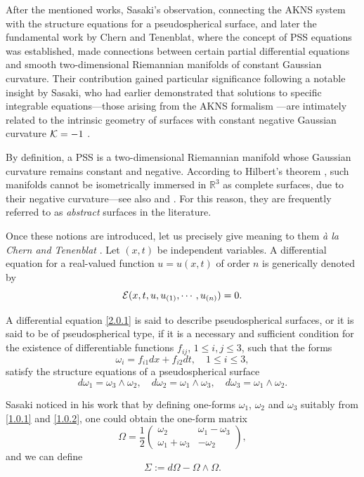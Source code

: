 \documentclass{cimart}
\newcommand{\bb}{\begin{equation}}
\newcommand{\ee}{\end{equation}}
\begin{document}
After the mentioned works, Sasaki's observation, connecting the AKNS system \cite{akns} with the structure equations for a pseudospherical surface, and later the fundamental work by Chern and Tenenblat, where the concept of PSS equations \cite{chern} was established, made connections between certain partial differential equations and smooth two-dimensional Riemannian manifolds of constant Gaussian curvature. Their contribution gained particular significance following a notable insight by Sasaki, who had earlier demonstrated that solutions to specific integrable equations—those arising from the AKNS formalism \cite{akns}—are intimately related to the intrinsic geometry of surfaces with constant negative Gaussian curvature ${\cal K} = -1$ \cite{sasaki}.


By definition, a PSS is a two-dimensional Riemannian manifold whose Gaussian curvature remains constant and negative. According to Hilbert’s theorem \cite[Section 5-11]{carmo}, such manifolds cannot be isometrically immersed in $\mathbb{R}^3$ as complete surfaces, due to their negative curvature—see also \cite[page 439]{neil} and \cite{milnor}. For this reason, they are frequently referred to as {\it abstract} surfaces in the literature.

Once these notions are introduced, let us precisely give meaning to them {\it à la Chern and Tenenblat} \cite{chern}. Let $(x,t)$ be independent variables. A differential equation for a real-valued function $u=u(x,t)$ of order $n$ is generically denoted by 
\bb\label{2.0.1}
{\cal E}(x,t,u,u_{(1)},\cdots,u_{(n)})=0.
\ee

\begin{definition}\label{def2.1}
A differential equation \eqref{2.0.1} is said to describe pseudospherical surfaces, or it is said to be of pseudospherical type, if it is a necessary and sufficient condition for the existence of differentiable functions $f_{ij}$, $1\leq i,j\leq 3$, such that the forms 
\bb\label{2.0.2}
\omega_i=f_{i1}dx+f_{i2}dt,\quad 1\leq i\leq 3,
\ee
satisfy the structure equations of a pseudospherical surface 
\bb\label{2.0.3}
d\omega_1=\omega_3\wedge\omega_2,\quad d\omega_2=\omega_1\wedge\omega_3,\quad d\omega_3=\omega_1\wedge\omega_2.
\ee
\end{definition}

Sasaki noticed in his work \cite{sasaki} that by defining one-forms $\omega_1$, $\omega_2$ and $\omega_3$ suitably from \eqref{1.0.1} and \eqref{1.0.2}, one could obtain the one-form matrix
\bb\label{2.0.4}
\Omega=\frac{1}{2}\begin{pmatrix}
\omega_2 & \omega_1-\omega_3 \\
\omega_1+\omega_3 & -\omega_2
\end{pmatrix},
\ee
and we can define
\bb\label{2.0.5}
\Sigma:=d\Omega-\Omega\wedge\Omega.
\ee
\end{document}
